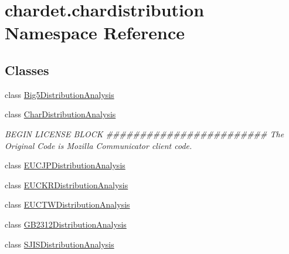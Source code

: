 \hypertarget{namespacechardet_1_1chardistribution}{}\section{chardet.\+chardistribution Namespace Reference}
\label{namespacechardet_1_1chardistribution}
\subsection*{Classes}
\begin{DoxyCompactItemize}
\item 
class \hyperlink{classchardet_1_1chardistribution_1_1_big5_distribution_analysis}{Big5\+Distribution\+Analysis}
\item 
class \hyperlink{classchardet_1_1chardistribution_1_1_char_distribution_analysis}{Char\+Distribution\+Analysis}
\begin{DoxyCompactList}\small\item\em B\+E\+G\+IN L\+I\+C\+E\+N\+SE B\+L\+O\+CK \#\#\#\#\#\#\#\#\#\#\#\#\#\#\#\#\#\#\#\#\#\#\#\# The Original Code is Mozilla Communicator client code. \end{DoxyCompactList}\item 
class \hyperlink{classchardet_1_1chardistribution_1_1_e_u_c_j_p_distribution_analysis}{E\+U\+C\+J\+P\+Distribution\+Analysis}
\item 
class \hyperlink{classchardet_1_1chardistribution_1_1_e_u_c_k_r_distribution_analysis}{E\+U\+C\+K\+R\+Distribution\+Analysis}
\item 
class \hyperlink{classchardet_1_1chardistribution_1_1_e_u_c_t_w_distribution_analysis}{E\+U\+C\+T\+W\+Distribution\+Analysis}
\item 
class \hyperlink{classchardet_1_1chardistribution_1_1_g_b2312_distribution_analysis}{G\+B2312\+Distribution\+Analysis}
\item 
class \hyperlink{classchardet_1_1chardistribution_1_1_s_j_i_s_distribution_analysis}{S\+J\+I\+S\+Distribution\+Analysis}
\end{DoxyCompactItemize}
